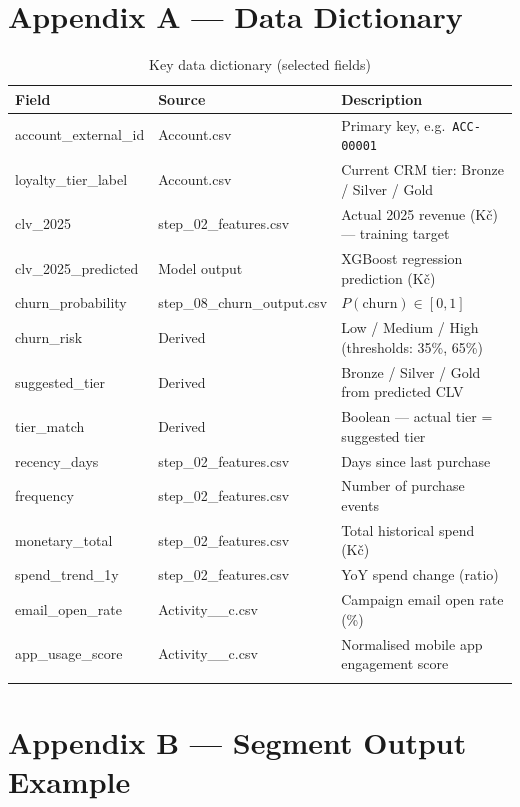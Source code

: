 \documentclass[11pt,a4paper]{article}
\begin{document}
\section{Appendix A — Data Dictionary}

\begin{longtable}{p{4.5cm}p{3.5cm}p{5cm}}
\toprule
\textbf{Field} & \textbf{Source} & \textbf{Description} \\
\midrule
\endhead
account\_external\_id & Account.csv & Primary key, e.g.\ \texttt{ACC-00001} \\
loyalty\_tier\_label  & Account.csv & Current CRM tier: Bronze / Silver / Gold \\
clv\_2025             & step\_02\_features.csv & Actual 2025 revenue (Kč) — training target \\
clv\_2025\_predicted  & Model output & XGBoost regression prediction (Kč) \\
churn\_probability    & step\_08\_churn\_output.csv & $P(\text{churn}) \in [0,1]$ \\
churn\_risk           & Derived & Low / Medium / High (thresholds: 35\%, 65\%) \\
suggested\_tier       & Derived & Bronze / Silver / Gold from predicted CLV \\
tier\_match           & Derived & Boolean — actual tier = suggested tier \\
recency\_days         & step\_02\_features.csv & Days since last purchase \\
frequency             & step\_02\_features.csv & Number of purchase events \\
monetary\_total       & step\_02\_features.csv & Total historical spend (Kč) \\
spend\_trend\_1y      & step\_02\_features.csv & YoY spend change (ratio) \\
email\_open\_rate     & Activity\_\_c.csv & Campaign email open rate (\%) \\
app\_usage\_score     & Activity\_\_c.csv & Normalised mobile app engagement score \\
\bottomrule
\caption{Key data dictionary (selected fields)}
\end{longtable}

\section{Appendix B — Segment Output Example}
\end{document}
